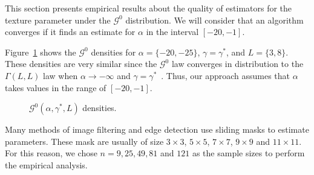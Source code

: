 \documentclass[twocolumn]{svjour3}
\begin{document}
	This section presents empirical results about the quality of estimators for the texture parameter under the $\mathcal G^0$ distribution. 
	We will consider that an algorithm converges if it finds an estimate for $\alpha$ in the interval $[-20,-1]$.    
	
	Figure~\ref{densidades} shows the $\mathcal{G}^0$ densities for  $\alpha=\{-20,-25\}$, $\gamma=\gamma^*$, and $L=\{3,8\}$. 
	These densities are very similar since the $\mathcal{G}^0$ law converges in distribution to the $\Gamma(L,L)$ law when $\alpha \to -\infty$ and $\gamma=\gamma^*$~\cite{Frery99}. 
	Thus, our approach assumes that $\alpha$ takes values in the range of $[-20,-1]$. 
	
	\begin{figure}[hbt]
		\centering
		\caption{$\mathcal{G}^0(\alpha,\gamma^*,L)$ densities.}\label{densidades} 
	\end{figure}
	
	Many methods of image filtering and edge detection use sliding masks to estimate parameters. 
	These mask are usually of size $3 \times 3$, $5 \times 5$, $7 \times 7$, $9 \times 9$ and $11 \times 11$. 
	For this reason, we chose $n=9,25,49,81$ and $121$ as the sample sizes to perform the empirical analysis.
	
\end{document}

